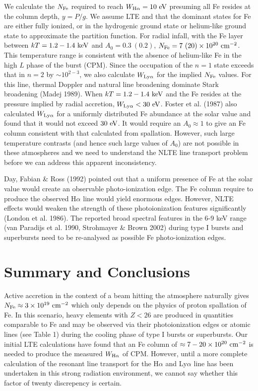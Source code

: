 \documentclass[iop,apjl,letterpaper]{emulateapj}
\begin{document}
We calculate the $N_{\rm Fe}$ required to reach $W_{\rm H\alpha} = 10\
{\rm eV}$ presuming all Fe resides at the column depth, $y=P/g$.  We
assume LTE and that the dominant states for Fe are either fully
ionized, or in the hydrogenic ground state or helium-like ground state
to approximate the partition function.  For radial infall, with the Fe
layer between $kT = 1.2-1.4\ {\rm keV}$ and $A_0 = 0.3\ (0.2)$,
$N_{\rm Fe} = 7\ (20) \times 10^{20}\ {\rm cm}^{-2}$.  This
temperature range is consistent with the absence of helium-like Fe in
the high $L$ phase of the burst (CPM).  Since the occupation of the
$n=1$ state exceeds that in $n=2$ by $\sim 10^{2-3}$, we also
calculate $W_{\rm Ly\alpha}$ for the implied $N_{\rm Fe}$ values.  For
this line, thermal Doppler and natural line broadening dominate Stark
broadening (Madej 1989).  When $kT = 1.2 - 1.4\ {\rm keV}$ and the Fe
resides at the pressure implied by radial accretion, $W_{\rm Ly\alpha}
< 30\ {\rm eV}$.  Foster et al. (1987) also calculated $W_{\rm
Ly\alpha}$ for a uniformly distributed Fe abundance at the solar value
and found that it would not exceed $30\ {\rm eV}$. It would require
an $A_0\approx 1$ to give an Fe column consistent with that calculated
from spallation.  However, such large temperature contrasts (and hence
such large values of $A_0$) are not possible in these atmospheres and
we need to understand the NLTE line transport problem before we
can address this apparent inconsistency. 

 Day, Fabian \& Ross (1992) pointed out that a uniform presence of Fe
at the solar value would create an observable photo-ionization edge.
The Fe column require to produce the observed H$\alpha$ line would
yield enormous edges. However, NLTE effects would weaken the strength
of these photoionization features significantly (London et al. 1986).
The reported broad spectral features in the 6-9 keV range (van
Paradijs et al. 1990, Strohmayer \& Brown 2002) during type I bursts
and superbursts need to be re-analysed as possible Fe photo-ionization
edges.


\section{Summary and Conclusions}

  Active accretion in the context of a beam hitting the atmosphere
naturally gives $N_{\rm Fe}\approx 3\times 10^{19}\ {\rm cm}^{-2}$
which only depends on the physics of proton spallation of Fe. In this
scenario, heavy elements with $Z<26$ are produced in quantities
comparable to Fe and may be observed via their photoionization edges
or atomic lines (see Table 1) during the cooling phase of type I
bursts or superbursts. Our initial LTE calculations have found that an
Fe column of $\approx 7-20 \times 10^{20}\ {\rm cm}^{-2}$ is needed to
produce the measured $W_{\rm H\alpha}$ of CPM. However, until a more
complete calculation of the resonant line transport for the H$\alpha$
and Ly$\alpha$ line has been undertaken in this strong radiation
environment, we cannot say whether this factor of twenty discrepency
is certain.
\end{document}
